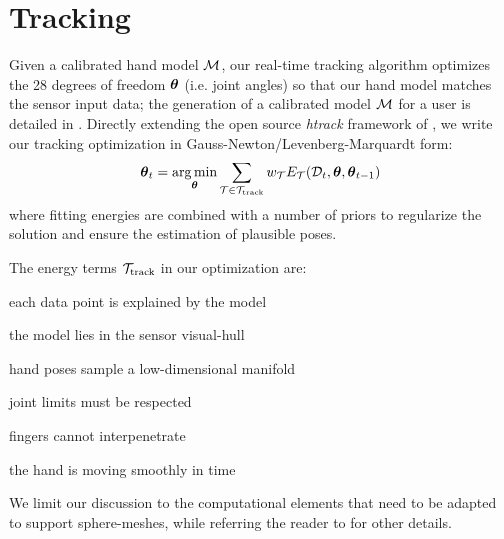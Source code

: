 

\section{Tracking}
\label{sec:tracking}
Given a calibrated hand model $\mathcal{M}$, our real-time tracking algorithm optimizes the 28 degrees of freedom $\boldsymbol{\theta}$ (i.e. joint angles) so that our hand model matches the sensor input data; the generation of a calibrated model $\mathcal{M}$ for a user is detailed in . Directly extending the open source \emph{htrack} framework of \cite{tagliasacchi2015robust}, we write our tracking optimization in Gauss-Newton/Levenberg-Marquardt form:
% 
\begin{eqnarray}
\boldsymbol{\theta}_t = \operatorname*{arg\,min}_{\boldsymbol{\theta}}
\sum_{\mathcal{T} \in {\mathcal{T}_\text{track}}} 
w_\mathcal{T} E_\mathcal{T}(\mathcal{D}_t,\boldsymbol{\theta},\boldsymbol{\theta}_{t-1})
\label{eq:htrack}
\end{eqnarray}
% 
where fitting energies are combined with a number of priors to regularize the solution and ensure the estimation of plausible poses. 

The energy terms ${\mathcal{T}_\text{track}}$ in our optimization are:
% 
\begin{description}[labelsep=0em,labelwidth=.6in,labelindent=.25cm,itemsep=-.6em]
    \item[d2m]          each data point is explained by the model
    \item[m2d]          the model lies in the sensor visual-hull
    \item[pose]         hand poses sample a low-dimensional manifold
    \item[limits]       joint limits must be respected
    \item[collision]    fingers cannot interpenetrate
    \item[temporal]     the hand is moving smoothly in time
\end{description}
% 
We limit our discussion to the computational elements that need to be adapted to support sphere-meshes, while referring the reader to \cite{tagliasacchi2015robust} for other details.

\newpage
